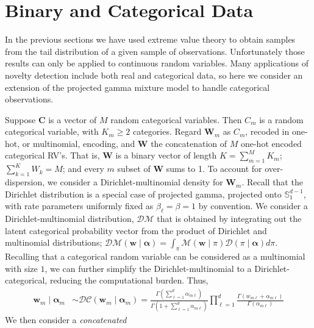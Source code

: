 \section{Binary and Categorical Data\label{sec:categorical}}
In the previous sections we have used extreme value theory to obtain samples
    from the tail distribution of a given sample of observations. Unfortunately 
    those results can only be applied to continuous random variables.  Many 
    applications of novelty detection include both real and categorical 
    data, so here we consider an extension of the projected gamma mixture model 
    to handle categorical observations. 

Suppose $\bm{C}$ is a vector of $M$ random categorical variables.  Then $C_m$ 
    is a random categorical variable, with $K_{m} \geq 2$ categories. Regard 
    $\bm{W}_m$ as $C_m$, recoded in one-hot, or multinomial, encoding, and 
    $\bm{W}$ the concatenation of $M$ one-hot encoded categorical RV's. That is, 
    $\bm{W}$ is a binary vector of length $K = \sum_{m = 1}^M K_{m}$; 
    $\sum_{k = 1}^K W_k = M$; and every $m$ subset of $\bm{W}$ sums to 1.
    To account for over-dispersion, we consider a Dirichlet-multinomial 
    density for $\bm{W}_m$. Recall that the Dirichlet distribution is a 
    special case of projected gamma, projected onto $\mathbb{S}_1^{d-1}$, 
    with rate parameters uniformly fixed as $\beta_{\ell} = \beta = 1$ 
    by convention.  We consider a Dirichlet-multinomial distribution, $\mathcal{DM}$
    that is obtained by integrating out the latent categorical probability vector 
    from the product of Dirichlet and multinomial distributions; 
    $\mathcal{DM}(\bm{w}\mid\bm{\alpha}) = \int_{\pi}\mathcal{M}(\bm{w}\mid\pi)\mathcal{D}(\pi\mid\bm{\alpha})d\pi$.
    Recalling that a categorical random variable can be considered as a multinomial with 
    size $1$, we can further simplify the Dirichlet-multinomial to a 
    Dirichlet-categorical, reducing the computational burden. Thus,
    \begin{equation}
        \begin{aligned}
        \label{eqn:dirmultinom}
        \bm{w}_{m}\mid\bm{\alpha}_m 
        &\sim 
        \mathcal{DC}(\bm{w}_m\mid\bm{\alpha}_m) = 
        \frac{\Gamma(\sum_{\ell=1}^d \alpha_{m\ell})}{\Gamma(1 + \sum_{\ell = 1}^d\alpha_{m\ell})}
        \prod_{\ell = 1}^d \frac{\Gamma(w_{m\ell} + \alpha_{m\ell})}{\Gamma(\alpha_{m\ell})}
        \end{aligned}
    \end{equation}
    We then consider a \emph{concatenated} 

